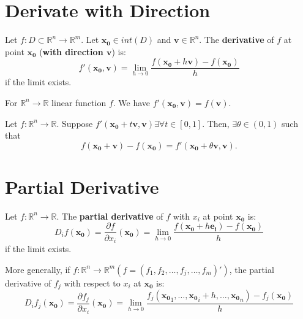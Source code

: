 
\section{Derivate with Direction}

\begin{definition}
    Let $f: D \subset  \mathbb{R}^{n} \to \mathbb{R}^{m}$. Let $\mathbf{x_0} \in int(D)$ and $\mathbf{v} \in \mathbb{R}^{n}$. The \textbf{derivative} of $f$ at point $\mathbf{x_0}$ (\textbf{with direction $\mathbf{v}$}) is:
    \[
        f'(\mathbf{x_0},\mathbf{v}) = \lim_{h \to 0} \frac{f(\mathbf{x_0}+h \mathbf{v}) - f(\mathbf{x_0})}{h}
    \]
    if the limit exists.
\end{definition}


\begin{example*}
    For $\mathbb{R}^{n} \to \mathbb{R}$ linear function $f$. We have $f'(\mathbf{x_0},\mathbf{v}) = f(\mathbf{v}).$
\end{example*}

\begin{theorem}
    Let $f: \mathbb{R}^{n} \to \mathbb{R}$. Suppose $f'(\mathbf{x_0}+t \mathbf{v},\mathbf{v}) \exists \forall t \in [0,1]$. Then, $\exists \theta \in (0,1)$ such that \[
        f(\mathbf{x_0}+\mathbf{v}) - f(\mathbf{x_0}) = f'(\mathbf{x_0}+\theta \mathbf{v}, \mathbf{v}).
    \]
\end{theorem}

\section{Partial Derivative}

\begin{definition}
    Let $f: \mathbb{R}^{n} \to \mathbb{R}$. The \textbf{partial derivative} of $f$ with $x_i$ at point $\mathbf{x_0}$ is:
    \[
        D_if(\mathbf{x_0}) = \frac{\partial f}{\partial x_i}(\mathbf{x_0}) = \lim_{h \to 0} \frac{f(\mathbf{x_0} + h \mathbf{e_i}) - f(\mathbf{x_0})}{h}
    \]
    if the limit exists.

    More generally, if $f: \mathbb{R}^{n} \to \mathbb{R}^{m} (f = (f_1, f_2, \dots,f_j,\dots,f_m)')$, the partial derivative of $f_j$ with respect to $x_i$ at $\mathbf{x_0}$ is:
    \[
        D_if_j(\mathbf{x_0}) = \frac{\partial f_j}{\partial x_i}(\mathbf{x_0}) = \lim_{h \to 0} \frac{f_j(\mathbf{x_0}_1, \dots, \mathbf{x_0}_i+h,\dots,\mathbf{x_0}_n)-f_j(\mathbf{x_0})}{h}
    \]
\end{definition}

